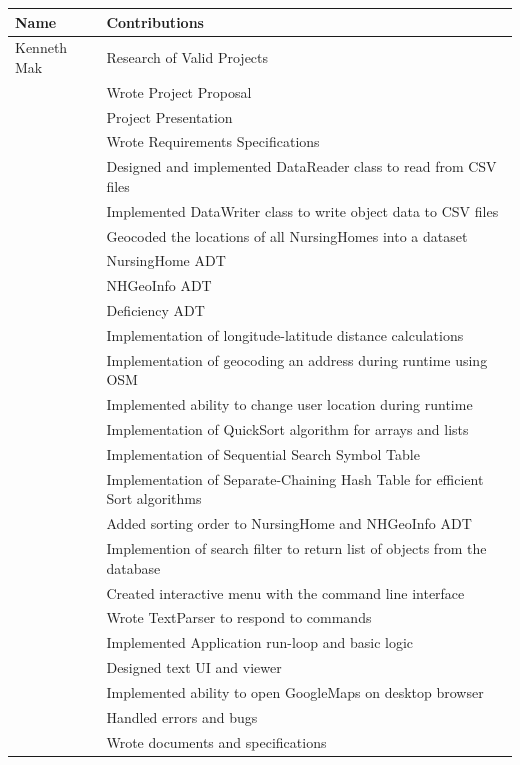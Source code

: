 \documentclass[12pt]{article}
\begin{document}
\begin{center}
\begin{tabular}{|p{0.2\hsize}|p{0.75\hsize}|}
\hline
\textbf{Name} & \textbf{Contributions}\\
\hline
Kenneth Mak & Research of Valid Projects\\
  & Wrote Project Proposal\\
  & Project Presentation\\
  & Wrote Requirements Specifications\\
  & Designed and implemented DataReader class to read from CSV files\\
  & Implemented DataWriter class to write object data to CSV files\\
  & Geocoded the locations of all NursingHomes into a dataset\\
  & NursingHome ADT\\
  & NHGeoInfo ADT\\
  & Deficiency ADT\\
  & Implementation of longitude-latitude distance calculations\\
  & Implementation of geocoding an address during runtime using OSM\\
  & Implemented ability to change user location during runtime\\
  & Implementation of QuickSort algorithm for arrays and lists\\
  & Implementation of Sequential Search Symbol Table\\
  & Implementation of Separate-Chaining Hash Table for efficient Sort algorithms\\
  & Added sorting order to NursingHome and NHGeoInfo ADT\\
  & Implemention of search filter to return list of objects from the database\\
  & Created interactive menu with the command line interface\\
  & Wrote TextParser to respond to commands\\
  & Implemented Application run-loop and basic logic\\
  & Designed text UI and viewer\\
  & Implemented ability to open GoogleMaps on desktop browser\\
  & Handled errors and bugs\\
  & Wrote documents and specifications\\
\hline
\end{tabular}
\end{center}
\end{document}
